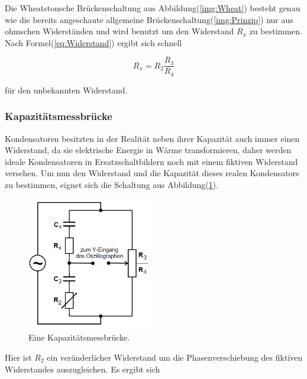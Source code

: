             \noindent Die Wheatstonsche Brückenschaltung aus Abbildung(\ref{img:Wheat}) besteht genau wie die bereits angeschaute allgemeine 
            Brückenschaltung(\ref{img:Prinzip}) nur aus ohmschen Widerständen und wird benutzt um den Widerstand $R_x$ zu bestimmen. 
            Nach Formel(\ref{eq:Widerstand}) ergibt sich schnell 

            \begin{equation}
                R_x = R_2 \frac{R_3}{R_4}
            \end{equation}

            \noindent für den unbekannten Widerstand.

        \subsubsection{Kapazitätsmessbrücke}

            \noindent Kondensatoren besitzten in der Realität neben ihrer Kapazität auch immer einen Widerstand, da sie elektrische Energie 
            in Wärme transformieren, daher werden ideale Kondensatoren in Ersatzschaltbildern noch mit einem fiktiven Widerstand versehen. 
            Um nun den Widerstand und die Kapazität dieses realen Kondensators zu bestimmen, eignet sich die Schaltung aus 
            Abbildung(\ref{img:Kapa}).

            \begin{figure}[ht]
                \centering
                \includegraphics[width=0.5\textwidth]{latex/images/Kondensator.PNG}
                \caption{Eine Kapazitätsmessbrücke\protect \cite{V302}.}
                \label{img:Kapa}
            \end{figure}

            \noindent Hier ist $R_2$ ein veränderlicher Widerstand um die Phasenverschiebung des fiktiven Widerstandes auszugleichen. 
            Es ergibt sich 

